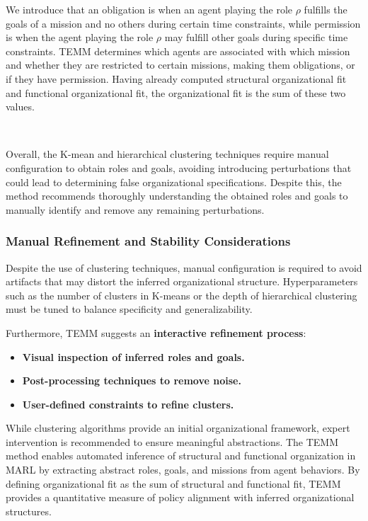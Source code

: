 \documentclass[pdflatex,sn-mathphys-num]{sn-jnl}%
\theoremstyle{thmstyleone}%
\theoremstyle{thmstyletwo}%
\theoremstyle{thmstylethree}%
\begin{document}
We introduce that an obligation is when an agent playing the role $\rho$ fulfills the goals of a mission and no others during certain time constraints, while permission is when the agent playing the role $\rho$ may fulfill other goals during specific time constraints.
TEMM determines which agents are associated with which mission and whether they are restricted to certain missions, making them obligations, or if they have permission.
Having already computed structural organizational fit and functional organizational fit, the organizational fit is the sum of these two values.

\

Overall, the K-mean and hierarchical clustering techniques require manual configuration to obtain roles and goals, avoiding introducing perturbations that could lead to determining false organizational specifications. Despite this, the method recommends thoroughly understanding the obtained roles and goals to manually identify and remove any remaining perturbations.

\subsubsection{Manual Refinement and Stability Considerations}

Despite the use of clustering techniques, manual configuration is required to avoid artifacts that may distort the inferred organizational structure. Hyperparameters such as the number of clusters in K-means or the depth of hierarchical clustering must be tuned to balance specificity and generalizability.

Furthermore, TEMM suggests an \textbf{interactive refinement process}:
\begin{itemize}
    \item \textbf{Visual inspection of inferred roles and goals.}
    \item \textbf{Post-processing techniques to remove noise.}
    \item \textbf{User-defined constraints to refine clusters.}
\end{itemize}

While clustering algorithms provide an initial organizational framework, expert intervention is recommended to ensure meaningful abstractions. The TEMM method enables automated inference of structural and functional organization in MARL by extracting abstract roles, goals, and missions from agent behaviors. By defining organizational fit as the sum of structural and functional fit, TEMM provides a quantitative measure of policy alignment with inferred organizational structures.
\end{document}
